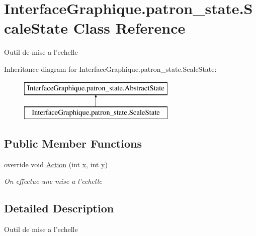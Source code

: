 \hypertarget{class_interface_graphique_1_1patron__state_1_1_scale_state}{\section{Interface\-Graphique.\-patron\-\_\-state.\-Scale\-State Class Reference}
\label{class_interface_graphique_1_1patron__state_1_1_scale_state}
}


Outil de mise a l'echelle  


Inheritance diagram for Interface\-Graphique.\-patron\-\_\-state.\-Scale\-State\-:\begin{figure}[H]
\begin{center}
\leavevmode
\includegraphics[height=2.000000cm]{class_interface_graphique_1_1patron__state_1_1_scale_state}
\end{center}
\end{figure}
\subsection*{Public Member Functions}
\begin{DoxyCompactItemize}
\item 
override void \hyperlink{class_interface_graphique_1_1patron__state_1_1_scale_state_af8fe6bca0517beed3c6b9106886d7408}{Action} (int \hyperlink{group__inf2990_ga6150e0515f7202e2fb518f7206ed97dc}{x}, int \hyperlink{group__inf2990_ga0a2f84ed7838f07779ae24c5a9086d33}{y})
\begin{DoxyCompactList}\small\item\em On effectue une mise a l'echelle \end{DoxyCompactList}\end{DoxyCompactItemize}


\subsection{Detailed Description}
Outil de mise a l'echelle 



